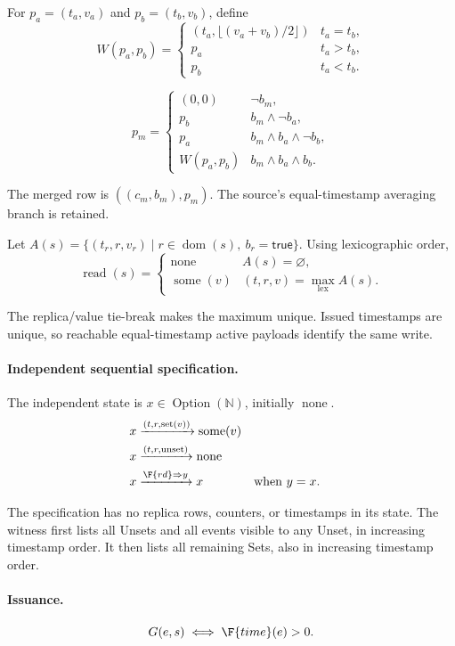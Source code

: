 For $p_a=(t_a,v_a)$ and $p_b=(t_b,v_b)$, define
\[
W(p_a,p_b)=\begin{cases}
(t_a,\lfloor(v_a+v_b)/2\rfloor)&t_a=t_b,\\
p_a&t_a>t_b,\\
p_b&t_a<t_b.
\end{cases}
\]

\[
p_m=\begin{cases}
(0,0)&\neg b_m,\\
p_b&b_m\land\neg b_a,\\
p_a&b_m\land b_a\land\neg b_b,\\
W(p_a,p_b)&b_m\land b_a\land b_b.
\end{cases}
\]

The merged row is $((c_m,b_m),p_m)$. The source’s equal-timestamp averaging branch is retained.

Let $A(s)=\{(t_r,r,v_r)\mid r\in\operatorname{dom}(s),\ b_r=\mathsf{true}\}$. Using lexicographic order,
\[
\operatorname{read}(s)=\begin{cases}
\operatorname{none}&A(s)=\varnothing,\\
\operatorname{some}(v)&(t,r,v)=\max_{\mathrm{lex}} A(s).
\end{cases}
\]

The replica/value tie-break makes the maximum unique. Issued timestamps are unique, so reachable equal-timestamp active payloads identify the same write.


\paragraph{Independent sequential specification.}
The independent state is $x\in\operatorname{Option}(\mathbb N)$, initially $\operatorname{none}$.
\[
\begin{aligned}
x&\xrightarrow{(t,r,\mathrm{set}(v))}\operatorname{some}(v)\\
x&\xrightarrow{(t,r,\mathrm{unset})}\operatorname{none}\\
x&\xrightarrow{\F{rd}\Rightarrow y}x&&\text{when }y=x.
\end{aligned}
\]

The specification has no replica rows, counters, or timestamps in its state.
The witness first lists all Unsets and all events visible to any Unset,
in increasing timestamp order. It then lists all remaining Sets, also in
increasing timestamp order.


\paragraph{Issuance.}
\[
G(e,s)\iff \F{time}(e)>0.
\]

